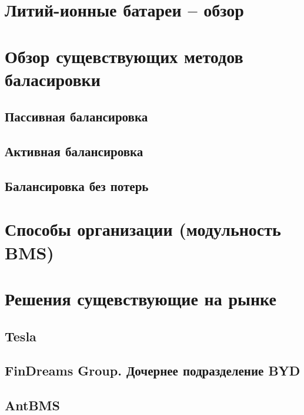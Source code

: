 \section{Литий-ионные батареи -- обзор}


\section{Обзор сущевствующих методов баласировки}


\subsection{Пассивная балансировка}


\subsection{Активная балансировка}


\subsection{Балансировка \glqq без потерь\grqq}


\section{Способы организации (модульность BMS)}


\section{Решения сущевствующие на рынке}
\subsection{Tesla}


\subsection{FinDreams Group. Дочернее подразделение BYD}


\subsection{AntBMS}



